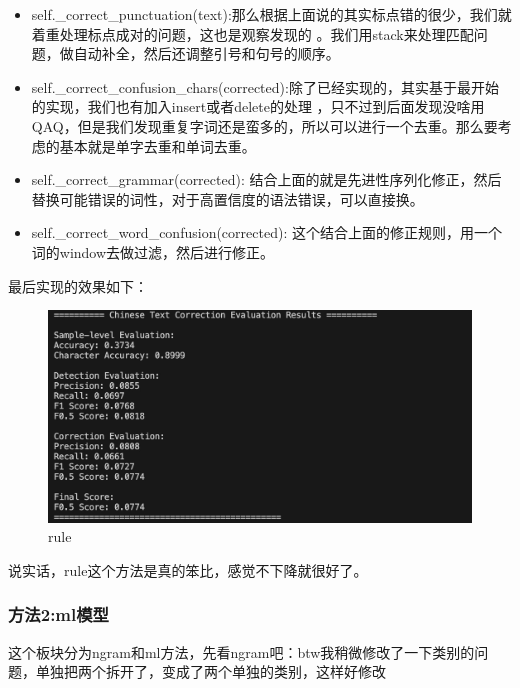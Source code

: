 \documentclass[answers]{exam}  %
\begin{document}
\begin{itemize}
    \item self.\_correct\_punctuation(text):那么根据上面说的其实标点错的很少，我们就着重处理标点成对的问题，这也是观察发现的
    。我们用stack来处理匹配问题，做自动补全，然后还调整引号和句号的顺序。
    \item self.\_correct\_confusion\_chars(corrected):除了已经实现的，其实基于最开始的实现，我们也有加入insert或者delete的处理
    ，只不过到后面发现没啥用QAQ，但是我们发现重复字词还是蛮多的，所以可以进行一个去重。那么要考虑的基本就是单字去重和单词去重。
    \item self.\_correct\_grammar(corrected): 结合上面的就是先进性序列化修正，然后替换可能错误的词性，对于高置信度的语法错误，可以直接换。
    \item self.\_correct\_word\_confusion(corrected): 这个结合上面的修正规则，用一个词的window去做过滤，然后进行修正。
\end{itemize}
最后实现的效果如下：\\
\begin{figure}[H]
    \centering
    \label{rule}
    \includegraphics[width=.6\textwidth]{../pic/rule.png} 
    \caption{rule}  
\end{figure}

说实话，rule这个方法是真的笨比，感觉不下降就很好了。

\subsubsection{方法2:ml模型}
这个板块分为ngram和ml方法，先看ngram吧：btw我稍微修改了一下类别的问题，单独把两个拆开了，变成了两个单独的类别，这样好修改\\
\medskip
\end{document}
